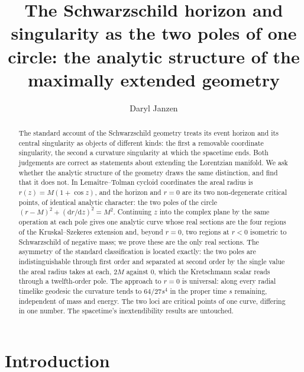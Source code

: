 \documentclass{iopjournal}
\theoremstyle{plain}
\theoremstyle{remark}
\newcommand{\dd}{\mathrm{d}}
\begin{document}


\title{The Schwarzschild horizon and singularity as the two poles of one circle: the analytic structure of the maximally extended geometry}

\author{Daryl Janzen}




\begin{abstract}
The standard account of the Schwarzschild geometry treats its event horizon and its central singularity as objects of different kinds: the first a removable coordinate singularity, the second a curvature singularity at which the spacetime ends. Both judgements are correct as statements about extending the Lorentzian manifold. We ask whether the analytic structure of the geometry draws the same distinction, and find that it does not. In Lemaître--Tolman cycloid coordinates the areal radius is $r(z)=M(1+\cos z)$, and the horizon and $r=0$ are its two non-degenerate critical points, of identical analytic character: the two poles of the circle $(r-M)^2+(\dd r/\dd z)^2=M^2$. Continuing $z$ into the complex plane by the same operation at each pole gives one analytic curve whose real sections are the four regions of the Kruskal--Szekeres extension and, beyond $r=0$, two regions at $r<0$ isometric to Schwarzschild of negative mass; we prove these are the only real sections. The asymmetry of the standard classification is located exactly: the two poles are indistinguishable through first order and separated at second order by the single value the areal radius takes at each, $2M$ against $0$, which the Kretschmann scalar reads through a twelfth-order pole. The approach to $r=0$ is universal: along every radial timelike geodesic the curvature tends to $64/27s^4$ in the proper time $s$ remaining, independent of mass and energy. The two loci are critical points of one curve, differing in one number. The spacetime's inextendibility results are untouched.
\end{abstract}

\section{Introduction}\label{sec:intro}
\end{document}
